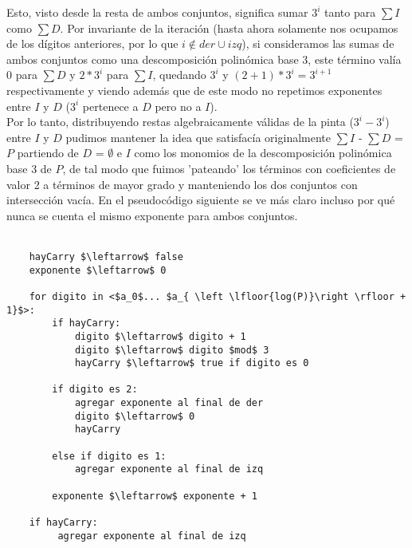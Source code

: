 	Esto, visto desde la resta de ambos conjuntos, significa sumar $3^{i}$ tanto para $\sum I$ como $\sum D$. Por invariante de la iteración (hasta ahora solamente nos ocupamos de los dígitos anteriores, por lo que $i \notin der \cup izq$), si consideramos las sumas de ambos conjuntos como una descomposición polinómica base 3, este término valía 0 para $\sum D$ y $2*3^{i}$ para $\sum I$, quedando $3^{i}$ y $(2+1)*3^{i} = 3^{i+1}$ respectivamente y viendo además que de este modo no repetimos exponentes entre $I$ y $D$ ($3^i$ pertenece a $D$ pero no a $I$).
	\\
	
	Por lo tanto, distribuyendo restas algebraicamente válidas de la pinta ($3^{i}-3^{i}$) entre $I$ y $D$ pudimos mantener la idea que satisfacía originalmente $\sum I$ - $\sum D$ = $P$ partiendo de $D$ = $\emptyset$ e $I$ como los monomios de la descomposición polinómica base 3 de $P$, de tal modo que fuimos 'pateando' los términos con coeficientes de valor 2 a términos de mayor grado y manteniendo los dos conjuntos con intersección vacía. En el pseudocódigo siguiente se ve más claro incluso por qué nunca se cuenta el mismo exponente para ambos conjuntos.
\\
\\
\begin{lstlisting}
    hayCarry $\leftarrow$ false				
    exponente $\leftarrow$ 0

    for digito in <$a_0$... $a_{ \left \lfloor{log(P)}\right \rfloor + 1}$>:
        if hayCarry:
            digito $\leftarrow$ digito + 1
            digito $\leftarrow$ digito $mod$ 3
            hayCarry $\leftarrow$ true if digito es 0

        if digito es 2:
            agregar exponente al final de der
            digito $\leftarrow$ 0
            hayCarry

        else if digito es 1:
            agregar exponente al final de izq

        exponente $\leftarrow$ exponente + 1

    if hayCarry:
         agregar exponente al final de izq

\end{lstlisting}

